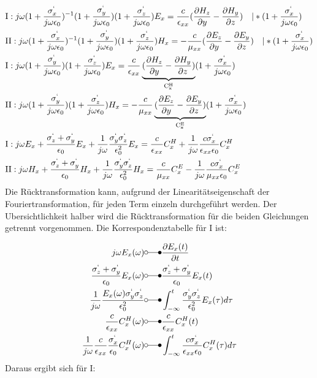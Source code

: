 \documentclass[11pt, ngerman]{article}
\begin{document}
\begin{align}
	&\text{I}: j\omega(1+\frac{\sigma^`_x}{j\omega\epsilon_0})^{-1}(1+\frac{\sigma^`_y}{j\omega\epsilon_0})(1+\frac{\sigma^`_z}{j\omega\epsilon_0})
	E_x = \frac{c}{\epsilon_{xx}}(\frac{\partial H_z}{\partial y} - \frac{\partial H_y}{\partial z})\quad\vert *(1+\frac{\sigma^`_x}{j\omega\epsilon_0})\\
	&\text{II}: j\omega(1+\frac{\sigma^`_x}{j\omega\epsilon_0})^{-1}(1+\frac{\sigma^`_y}{j\omega\epsilon_0})(1+\frac{\sigma^`_z}{j\omega\epsilon_0})
	H_x = -\frac{c}{\mu_{xx}}(\frac{\partial E_z}{\partial y} - \frac{\partial E_y}{\partial z})\quad\vert *(1+\frac{\sigma^`_x}{j\omega\epsilon_0})\\
	&\text{I}: j\omega(1+\frac{\sigma^`_y}{j\omega\epsilon_0})(1+\frac{\sigma^`_z}{j\omega\epsilon_0})
	E_x = \frac{c}{\epsilon_{xx}}\underbrace{(\frac{\partial H_z}{\partial y} - \frac{\partial H_y}{\partial z})}_\mathrm{C_x^H}(1+\frac{\sigma^`_x}{j\omega\epsilon_0})\\
	&\text{II}: j\omega(1+\frac{\sigma^`_y}{j\omega\epsilon_0})(1+\frac{\sigma^`_z}{j\omega\epsilon_0})
	H_x = -\frac{c}{\mu_{xx}}\underbrace{(\frac{\partial E_z}{\partial y} - \frac{\partial E_y}{\partial z})}_\mathrm{C_x^E}(1+\frac{\sigma^`_x}{j\omega\epsilon_0})\\
	&\text{I}: j\omega E_x+\frac{\sigma^`_z+\sigma^`_y}{\epsilon_0}E_x+\frac{1}{j\omega}\frac{\sigma^`_y\sigma^`_z}{\epsilon_0^2}E_x 
	= \frac{c}{\epsilon_{xx}}C_x^H+\frac{1}{j\omega}\frac{c\sigma^`_x}{\epsilon_{xx}\epsilon_0}C_x^H\\
	&\text{II}: j\omega H_x+\frac{\sigma^`_z+\sigma^`_y}{\epsilon_0}H_x+\frac{1}{j\omega}\frac{\sigma^`_y\sigma^`_z}{\epsilon_0^2}H_x
	= \frac{c}{\mu_{xx}}C_x^E-\frac{1}{j\omega}\frac{c\sigma^`_x}{\mu_{xx}\epsilon_0}C_x^E
\end{align}
Die R\"ucktransformation kann, aufgrund der Linearit\"atseigenschaft der Fouriertransformation, f\"ur jeden Term einzeln durchgef\"uhrt werden.
Der Ubersichtlichkeit halber wird die R\"ucktransformation f\"ur die beiden Gleichungen getrennt vorgenommen.
\newpage
\noindent Die Korrespondenztabelle f\"ur I ist:

\begin{align}
	j\omega E_x(\omega) &\laplace \frac{\partial E_x(t)}{\partial t}\\
	\frac{\sgma_z + \sgma_y}{\epsilon_0}E_x(\omega) &\laplace \frac{\sgma_z + \sgma_y}{\epsilon_0}E_x(t)\\
	\frac{1}{j\omega}\frac{E_x(\omega)\sgma_y\sgma_z}{\epsilon_0^2} &\laplace \int_{-\infty}^t\frac{\sgma_y\sgma_z}{\epsilon_0^2}E_x(\tau)d\tau\\
	\frac{c}{\epsilon_{xx}}C_x^H(\omega) &\laplace \frac{c}{\epsilon_{xx}}C_x^H(t)\\
	\frac{1}{j\omega}\frac{c}{\epsilon_{xx}}\frac{\sgma_x}{\epsilon_0}C_x^H(\omega) &\laplace \int_{-\infty}^t \frac{c\sgma_x}{\epsilon_{xx}\epsilon_0}C_x^H(\tau)d\tau
\end{align}
Daraus ergibt sich f\"ur I:
\end{document}
